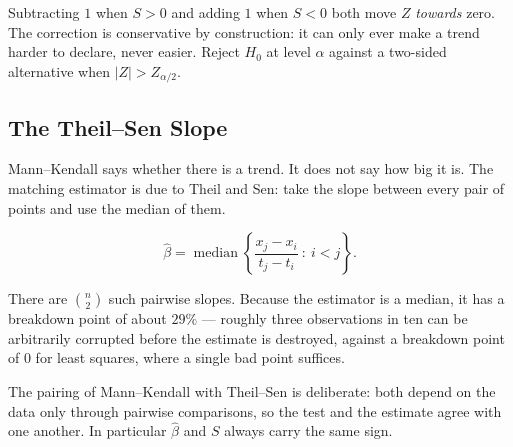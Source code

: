 \documentclass[11pt,a4paper]{article}
\theoremstyle{definition}
\begin{document}
Subtracting $1$ when $S > 0$ and adding $1$ when $S < 0$ both move $Z$
\emph{towards} zero. The correction is conservative by construction: it can only
ever make a trend harder to declare, never easier. Reject $H_0$ at level $\alpha$
against a two-sided alternative when
$\left|Z\right| > Z_{\alpha/2}$.

\subsection{The Theil--Sen Slope}

Mann--Kendall says whether there is a trend. It does not say how big it is. The
matching estimator is due to Theil and Sen: take the slope between every pair of
points and use the median of them.

$$\widehat{\beta} = \operatorname{median}\left\{
\dfrac{x_j - x_i}{t_j - t_i} \ :\ i < j \right\}.$$

There are $\binom{n}{2}$ such pairwise slopes. Because the estimator is a median,
it has a breakdown point of about $29\%$ --- roughly three observations in ten can
be arbitrarily corrupted before the estimate is destroyed, against a breakdown
point of $0$ for least squares, where a single bad point suffices.

The pairing of Mann--Kendall with Theil--Sen is deliberate: both depend on the
data only through pairwise comparisons, so the test and the estimate agree with
one another. In particular $\widehat{\beta}$ and $S$ always carry the same sign.
\end{document}
